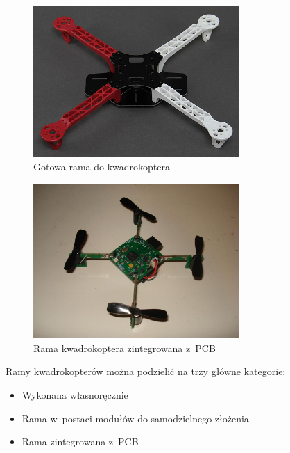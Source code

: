 \begin{figure}[H]
	\centering
		\includegraphics[width=0.7\textwidth]{Pictures/quadrotor_frame.jpg}
	\caption[Gotowa rama do kwadrokoptera]{Gotowa rama do kwadrokoptera~\cite{quadro21}}
	\label{fig:quadrotor_frame.jpg}
\end{figure}

\begin{figure}[H]
	\centering
		\includegraphics[width=0.7\textwidth]{Pictures/picocopter.jpg}
	\caption[Rama kwadrokoptera zintegrowana z~PCB]{Rama kwadrokoptera zintegrowana z~PCB~\cite{quadro22}}
	\label{fig:picocopter.jpg}
\end{figure}


Ramy kwadrokopterów można podzielić na trzy główne kategorie:

\begin{itemize}
	\item Wykonana własnoręcznie
	\item Rama w~postaci modułów do samodzielnego złożenia
	\item Rama zintegrowana z~PCB
\end{itemize}

